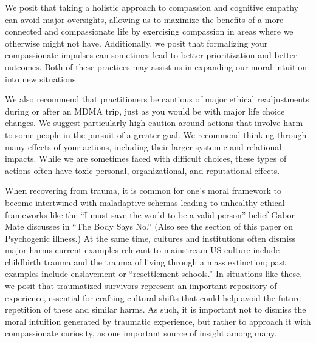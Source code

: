 \documentclass[12pt,letterpaper]{article}
\begin{document}
We posit that taking a holistic approach to compassion and cognitive empathy can avoid major oversights, allowing us to maximize the benefits of a more connected and compassionate life by exercising compassion in areas where we otherwise might not have. Additionally, we posit that formalizing your compassionate impulses can sometimes lead to better prioritization and better outcomes. Both of these practices may assist us in expanding our moral intuition into new situations.

We also recommend that practitioners be cautious of major ethical readjustments during or after an MDMA trip, just as you would be with major life choice changes. We suggest particularly high caution around actions that involve harm to some people in the pursuit of a greater goal. We recommend thinking through many effects of your actions, including their larger systemic and relational impacts. While we are sometimes faced with difficult choices, these types of actions often have toxic personal, organizational, and reputational effects.

When recovering from trauma, it is common for one's moral framework to become intertwined with maladaptive schemas-leading to unhealthy ethical frameworks like the “I must save the world to be a valid person” belief Gabor Mate discusses in “The Body Says No.” (Also see the section\todo{} of this paper on Psychogenic illness.) At the same time, cultures and institutions often dismiss major harms-current examples relevant to mainstream US culture include childbirth trauma and the trauma of living through a mass extinction; past examples include enslavement or “resettlement schools.” In situations like these, we posit that traumatized survivors represent an important repository of experience, essential for crafting cultural shifts that could help avoid the future repetition of these and similar harms. As such, it is important not to dismiss the moral intuition generated by traumatic experience, but rather to approach it with compassionate curiosity, as one important source of insight among many. 

\end{document}
